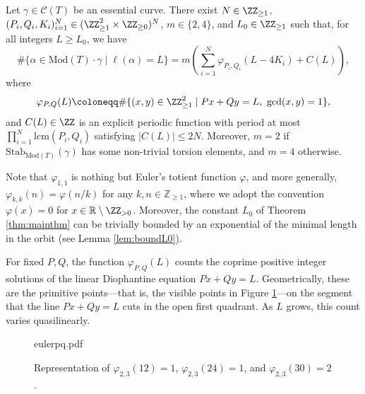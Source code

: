 \documentclass{article}
\newcommand{\Mod}{\mathrm{Mod}}
\begin{document}
	
	\begin{theorem}\label{thm:mainthm}
		Let $\gamma \in \mathcal{C}(T)$ be an essential curve.
		There exist $N \in \ZZ_{\geq 1}$, $(P_i, Q_i, K_i)_{i=1}^N \in (\ZZ_{\geq 1}^2 \times \ZZ_{\geq 0})^N$, $m\in\{2,4\}$, and $L_0 \in \ZZ_{\geq 1}$ such that, for all integers $L \geq L_0$, we have
		\[
		\# \{ \alpha \in \Mod(T) \cdot \gamma \mid \ell(\alpha) = L \}
		=
		m\left(\sum_{i=1}^{N} \varphi_{P_i, Q_i}(L - 4 K_i)
		+
		C(L) 
		\right),
		\]
		where
		\[
		\varphi_{P, Q}(L)
		\coloneqq
		\# \{ (x, y) \in \ZZ_{\geq1}^2 \mid Px + Qy = L, \ \gcd(x, y) = 1 \},
		\]
		and $C(L) \in \ZZ$ is an explicit periodic function with period at most $\prod_{i=1}^N\mathrm{lcm}(P_i,Q_i)$ satisfying $|C(L)|\leq 2N$. Moreover, 
			$m=2$ if $\mathrm{Stab}_{\mathrm{Mod}(T)}(\gamma)$ has some non-trivial torsion elements, and $m=4$ otherwise. 
	\end{theorem}
	Note that $\varphi_{1,1}$ is nothing but Euler's totient function $\varphi$,
    and more generally, $\varphi_{k,k}(n) = \varphi(n/k)$ for any $k, n \in \mathbb{Z}_{\geq 1}$, where we adopt the convention $\varphi(x) = 0$ for $x \in \mathbb{R}\setminus\ZZ_{>0}$. Moreover, the constant $L_0$ of Theorem \ref{thm:mainthm} can be trivially bounded by an exponential of the minimal length in the orbit (see Lemma \ref{lem:boundL0}). 
	
	For fixed $P,Q$, the function $\varphi_{P,Q}(L)$ counts the coprime positive integer solutions of the linear Diophantine equation $Px+Qy=L$. Geometrically, these are the primitive points---that is, the visible points in Figure \ref{fig:eulerpq}---on the segment that the line $Px+Qy=L$ cuts in the open first quadrant. As $L$ grows, this count varies quasilinearly.
	
	\begin{figure}[ht]\centering
		\begin{overpic}[width=.6\linewidth]{eulerpq.pdf}
		\end{overpic}
		\caption{Representation of $\varphi_{2,3}(12)=1$, $\varphi_{2,3}(24)=1$, and $\varphi_{2,3}(30)=2$.}
		\label{fig:eulerpq}
	\end{figure}
	
\end{document}
